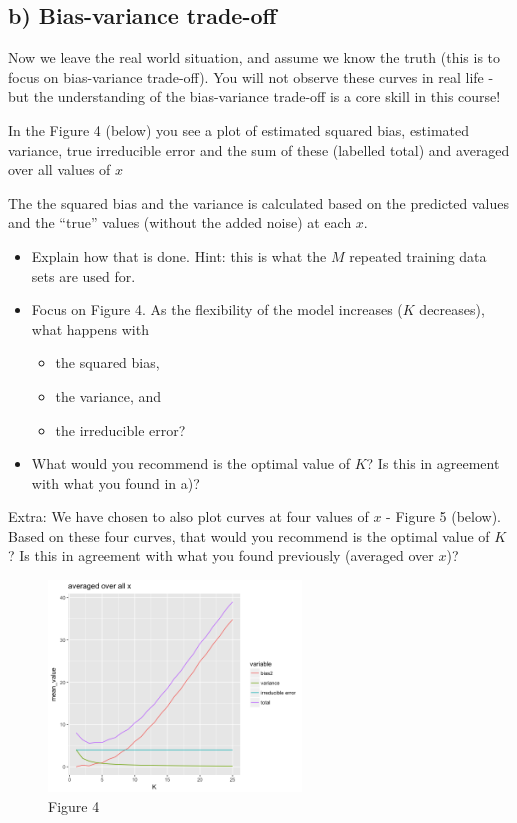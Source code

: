 \documentclass[]{article}
\providecommand{\tightlist}{%
  \setlength{\itemsep}{0pt}\setlength{\parskip}{0pt}}
\begin{document}
\subsection{b) Bias-variance trade-off}\label{b-bias-variance-trade-off}

Now we leave the real world situation, and assume we know the truth
(this is to focus on bias-variance trade-off). You will not observe
these curves in real life - but the understanding of the bias-variance
trade-off is a core skill in this course!

In the Figure 4 (below) you see a plot of estimated squared bias,
estimated variance, true irreducible error and the sum of these
(labelled total) and averaged over all values of \(x\)

The the squared bias and the variance is calculated based on the
predicted values and the ``true'' values (without the added noise) at
each \(x\).

\begin{itemize}
\tightlist
\item
  Explain how that is done. Hint: this is what the \(M\) repeated
  training data sets are used for.
\item
  Focus on Figure 4. As the flexibility of the model increases (\(K\)
  decreases), what happens with

  \begin{itemize}
  \tightlist
  \item
    the squared bias,\\
  \item
    the variance, and\\
  \item
    the irreducible error?
  \end{itemize}
\item
  What would you recommend is the optimal value of \(K\)? Is this in
  agreement with what you found in a)?
\end{itemize}

Extra: We have chosen to also plot curves at four values of \(x\) -
Figure 5 (below). Based on these four curves, that would you recommend
is the optimal value of \(K\)? Is this in agreement with what you found
previously (averaged over \(x\))?

\begin{figure}
\centering
\includegraphics[width=0.60000\textwidth]{Prob1f4.png}
\caption{Figure 4}
\end{figure}
\end{document}
